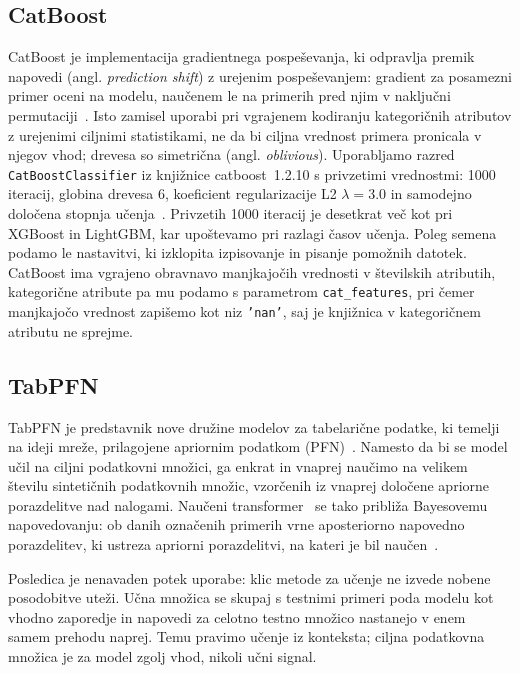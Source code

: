 \documentclass[a4paper,12pt,openright]{book}
\begin{document}
\subsection{CatBoost}
\label{sec:catboost}

CatBoost je implementacija gradientnega pospeševanja, ki odpravlja premik
napovedi (angl. \emph{prediction shift}) z urejenim pospeševanjem: gradient za
posamezni primer oceni na modelu, naučenem le na primerih pred njim v naključni
permutaciji~\cite{prokhorenkova2018catboost}. Isto zamisel uporabi pri vgrajenem
kodiranju kategoričnih atributov z urejenimi ciljnimi statistikami, ne da bi
ciljna vrednost primera pronicala v njegov vhod; drevesa so simetrična
(angl. \emph{oblivious}). Uporabljamo razred \texttt{CatBoostClassifier} iz
knjižnice catboost~1.2.10 s privzetimi vrednostmi: 1000 iteracij, globina
drevesa 6, koeficient regularizacije L2 $\lambda = \num{3.0}$ in samodejno
določena stopnja učenja~\cite{catboostdocs}. Privzetih 1000 iteracij je desetkrat več kot pri
XGBoost in LightGBM, kar upoštevamo pri razlagi časov učenja. Poleg semena
podamo le nastavitvi, ki izklopita izpisovanje in pisanje pomožnih datotek.
CatBoost ima vgrajeno obravnavo manjkajočih vrednosti v številskih atributih,
kategorične atribute pa mu podamo s parametrom \texttt{cat\_features}, pri čemer
manjkajočo vrednost zapišemo kot niz \texttt{'nan'}, saj je knjižnica v
kategoričnem atributu ne sprejme.

\subsection{TabPFN}
\label{sec:tabpfn}

TabPFN je predstavnik nove družine modelov za tabelarične podatke, ki temelji na
ideji mreže, prilagojene apriornim podatkom
(PFN)~\cite{muller2022transformers}. Namesto da bi se model učil na
ciljni podatkovni množici, ga enkrat in vnaprej naučimo na velikem številu
sintetičnih podatkovnih množic, vzorčenih iz vnaprej določene apriorne
porazdelitve nad nalogami. Naučeni transformer~\cite{vaswani2017attention} se
tako približa Bayesovemu napovedovanju: ob danih označenih primerih vrne
aposteriorno napovedno porazdelitev, ki ustreza apriorni porazdelitvi, na kateri
je bil naučen~\cite{muller2022transformers}.

Posledica je nenavaden potek uporabe: klic metode za učenje ne izvede nobene
posodobitve uteži. Učna množica se skupaj s testnimi primeri poda modelu kot
vhodno zaporedje in napovedi za celotno testno množico nastanejo v enem samem
prehodu naprej. Temu pravimo učenje iz konteksta; ciljna podatkovna množica je za model zgolj vhod, nikoli učni signal.
\end{document}
